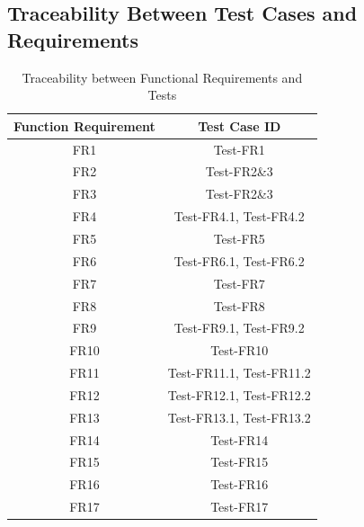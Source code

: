 \documentclass[12pt, titlepage]{article}
\begin{document}
\subsection{Traceability Between Test Cases and Requirements}
\begin{table}[H]
    \centering
    \begin{tabular}{|c|c|}
    \hline
    Function Requirement     &  Test Case ID\\
    \hline
    FR1     & Test-FR1\\
    \hline
    FR2 & Test-FR2\&3\\
    \hline
    FR3 & Test-FR2\&3\\
    \hline
     FR4 & Test-FR4.1, Test-FR4.2\\
    \hline
     FR5 & Test-FR5\\
    \hline
     FR6 & Test-FR6.1, Test-FR6.2\\
    \hline
     FR7 & Test-FR7\\
    \hline
     FR8 & Test-FR8\\
    \hline
     FR9 & Test-FR9.1, Test-FR9.2\\
    \hline
     FR10 & Test-FR10\\
    \hline
     FR11 & Test-FR11.1, Test-FR11.2\\
    \hline 
     FR12 & Test-FR12.1, Test-FR12.2\\
    \hline
    FR13 & Test-FR13.1, Test-FR13.2\\
    \hline
    FR14 & Test-FR14\\
    \hline
    FR15 & Test-FR15\\
    \hline
    FR16 & Test-FR16\\
    \hline
    FR17 & Test-FR17\\
    \hline
    \end{tabular}
    \caption{Traceability between Functional Requirements and Tests}
\end{table}
\newpage
\end{document}
